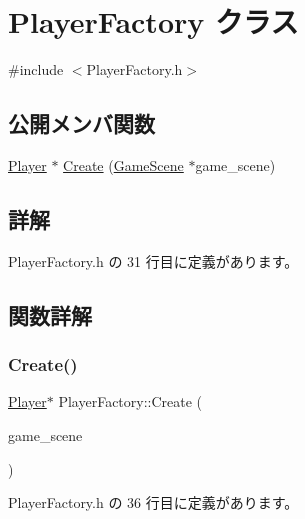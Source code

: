 \hypertarget{class_player_factory}{}\section{Player\+Factory クラス}
\label{class_player_factory}


{\ttfamily \#include $<$Player\+Factory.\+h$>$}

\subsection*{公開メンバ関数}
\begin{DoxyCompactItemize}
\item 
\mbox{\hyperlink{class_player}{Player}} $\ast$ \mbox{\hyperlink{class_player_factory_a7429328c81ec97fdaafb9eef756c0dba}{Create}} (\mbox{\hyperlink{class_game_scene}{Game\+Scene}} $\ast$game\+\_\+scene)
\end{DoxyCompactItemize}


\subsection{詳解}


 Player\+Factory.\+h の 31 行目に定義があります。



\subsection{関数詳解}
\mbox{\label{class_player_factory_a7429328c81ec97fdaafb9eef756c0dba}} 
\subsubsection{\texorpdfstring{Create()}{Create()}}
{\footnotesize\ttfamily \mbox{\hyperlink{class_player}{Player}}$\ast$ Player\+Factory\+::\+Create (\begin{DoxyParamCaption}\item[{\mbox{\hyperlink{class_game_scene}{Game\+Scene}} $\ast$}]{game\+\_\+scene }\end{DoxyParamCaption})\hspace{0.3cm}{\ttfamily [inline]}}



 Player\+Factory.\+h の 36 行目に定義があります。


